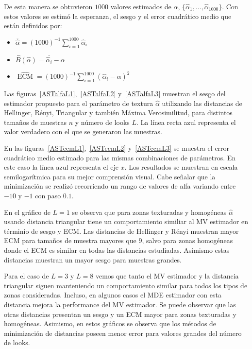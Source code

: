 De esta manera se obtuvieron $1000$ valores estimados de $\alpha$, $\{\widehat{\alpha}_1, \dots, \widehat{\alpha}_{1000}\}$. Con estos valores se estimó la esperanza, el sesgo y el error cuadrático medio que están definidos por:

\begin{itemize}
	\item $\overline{\widehat{\alpha}}=(1000)^{-1}{\sum_{i=1}^{1000}{\widehat{\alpha}_i}}$
	\item $\widehat{B}(\widehat\alpha) = \overline{\widehat\alpha_i}- \alpha$
	\item $\widehat{\operatorname{\text{ECM}}}=({1000})^{-1}{\sum_{i=1}^{1000}{(\widehat{\alpha}_i-\alpha)^2}}$
\end{itemize}


Las figuras~\ref{ASTalfaL1},~\ref{ASTalfaL2} y~\ref{ASTalfaL3} muestran el sesgo del estimador propuesto para el parámetro de textura $\widehat{\alpha}$ utilizando las distancias de Hellinger, Rényi, Triangular y también Máxima Verosimilitud, para distintos tamaños de muestras $n$ y número de looks $L$. 
La línea recta azul representa el valor verdadero con el que se generaron las muestras. 

En las figuras~\ref{ASTecmL1},~\ref{ASTecmL2} y~\ref{ASTecmL3} se muestra el error cuadrático medio estimado para las mismas combinaciones de parámetros. En este caso la línea azul representa el eje $x$. Los resultados se muestran en escala semilogarítmica para su mejor comprensión visual.
Cabe señalar que la minimización se realizó recorriendo un rango de valores de alfa variando entre $-10$ y $-1$ con paso  $0.1$. 

 
En el gráfico de $L=1$ se observa que para zonas texturadas y homogéneas  $\widehat{\alpha}$ usando distancia triangular tiene un comportamiento similiar al MV estimador en términio de sesgo y ECM. Las distancias de Hellinger y Rényi muestran mayor ECM para tamaños de muestra mayores que $9$, salvo para zonas homogéneas donde el ECM es similar en todas las distancias estudiadas. Asimismo estas distancias muestran un mayor sesgo para muestras grandes.

Para el caso de $L=3$ y $L=8$ vemos que tanto el MV estimador y la distancia triangular siguen manteniendo un comportamiento similar para todos los tipos de zonas consideradas. Incluso, en algunos casos el MDE estimador con esta distancia mejora la performance del MV estimador. Se puede observar que las otras distancias presentan un sesgo y un ECM mayor para zonas texturadas y homogéneas. Asimismo, en estos gráficos se observa que los métodos de minimización de distancias poseen menor error para valores grandes del número de looks. 

